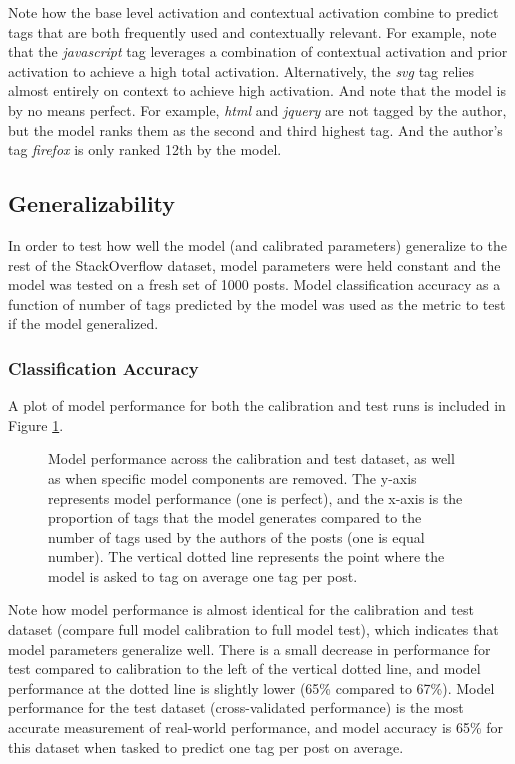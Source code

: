 \documentclass[10pt,letterpaper]{article}
\begin{document}
Note how the base level activation and contextual activation combine to predict tags that are both frequently used and contextually relevant.
For example, note that the \emph{javascript} tag leverages a combination of contextual activation and prior activation to achieve a high total activation.
Alternatively, the \emph{svg} tag relies almost entirely on context to achieve high activation.
And note that the model is by no means perfect.
For example, \emph{html} and \emph{jquery} are not tagged by the author, but the model ranks them as the second and third highest tag.
And the author's tag \emph{firefox} is only ranked 12th by the model.

\subsection{Generalizability}

In order to test how well the model (and calibrated parameters) generalize to the rest of the StackOverflow dataset,
model parameters were held constant and the model was tested on a fresh set of \num{1000} posts.
Model classification accuracy as a function of number of tags predicted by the model was used as the metric to test if the model generalized.

\subsubsection{Classification Accuracy}

A plot of model performance for both the calibration and test runs is included in Figure \ref{fig:ROC}.

\begin{figure}[ht]
  \centering
  \caption{
    Model performance across the calibration and test dataset, as well as when specific model components are removed.
    The y-axis represents model performance (one is perfect), and the x-axis is the proportion of tags that the model generates compared to the number of tags used by the authors of the posts (one is equal number).
    The vertical dotted line represents the point where the model is asked to tag on average one tag per post.
  }
  \label{fig:ROC}
\end{figure}

Note how model performance is almost identical for the calibration and test dataset (compare full model calibration to full model test), which indicates that model parameters generalize well.
There is a small decrease in performance for test compared to calibration to the left of the vertical dotted line, and model performance at the dotted line is slightly lower (65\% compared to 67\%).
Model performance for the test dataset (cross-validated performance) is the most accurate measurement of real-world performance,
and model accuracy is 65\% for this dataset when tasked to predict one tag per post on average.
\end{document}
